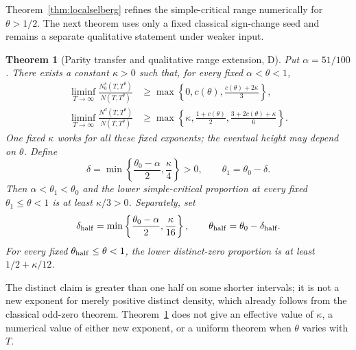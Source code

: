 ﻿\documentclass[11pt]{article}
\newtheorem{theorem}{Theorem}[section]
\theoremstyle{remark}
\begin{document}
Theorem~\ref{thm:localselberg} refines the simple-critical range numerically
for $\theta>1/2$. The next theorem uses only a fixed classical sign-change
seed and remains a separate qualitative statement under weaker input.

\begin{theorem}[Parity transfer and qualitative range extension, D]
\label{thm:parity}
Put $\alpha=51/100$. There exists a constant $\kappa>0$ such that, for
every fixed $\alpha<\theta<1$,
\begin{align}
\liminf_{T\to\infty}\frac{N_0^s(T,T^\theta)}{N(T,T^\theta)}
&\ge\max\left\{0,c(\theta),\frac{c(\theta)+2\kappa}{3}\right\},
\label{eq:paritysimple}\\
\liminf_{T\to\infty}\frac{N^d(T,T^\theta)}{N(T,T^\theta)}
&\ge\max\left\{\kappa,\frac{1+c(\theta)}2,
                    \frac{3+2c(\theta)+\kappa}{6}\right\}.
\label{eq:paritydistinct}
\end{align}
One fixed $\kappa$ works for all these fixed exponents; the eventual height
may depend on $\theta$. Define
\begin{equation}\label{eq:paritydelta}
\delta=\min\left\{\frac{\theta_0-\alpha}{2},\frac\kappa4\right\}>0,
\qquad \theta_1=\theta_0-\delta.
\end{equation}
Then $\alpha<\theta_1<\theta_0$ and the lower simple-critical proportion
at every fixed $\theta_1\le\theta<1$ is at least $\kappa/3>0$.
Separately, set
\begin{equation}\label{eq:halfdelta}
\delta_{\rm half}=\min\left\{\frac{\theta_0-\alpha}{2},
                                      \frac\kappa{16}\right\},
\qquad \theta_{\rm half}=\theta_0-\delta_{\rm half}.
\end{equation}
For every fixed $\theta_{\rm half}\le\theta<1$, the lower distinct-zero
proportion is at least $1/2+\kappa/12$.
\end{theorem}

The distinct claim is greater than one half on some shorter intervals; it
is not a new exponent for merely positive distinct density, which already
follows from the classical odd-zero theorem. Theorem~\ref{thm:parity}
does not give an effective value of $\kappa$, a numerical value of either
new exponent, or a uniform theorem when $\theta$ varies with $T$.
\end{document}
